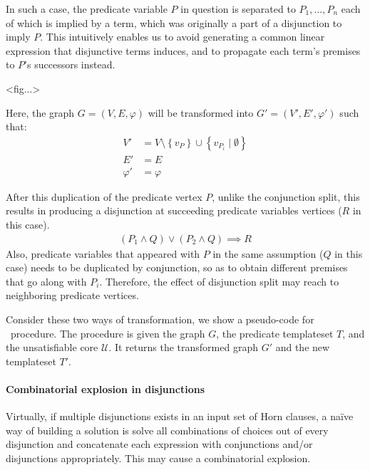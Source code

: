 \documentclass[master,final,12pt]{iscs-thesis}
\begin{document}
In such a case, the predicate variable $P$ in question is separated to
$P_1, \ldots, P_n$ each of which is implied by a term, which was
originally a part of a disjunction to imply $P$.  This intuitively
enables us to avoid generating a common linear expression that
disjunctive terms induces, and to propagate each term's premises to
$P$'s successors instead.

<fig...>

Here, the graph $G=(V,E,\varphi)$ will be transformed into
$G'=(V',E',\varphi')$ such that:
\begin{align*}
V' & = V \setminus \left\lbrace v_P \right\rbrace \cup
  \left\lbrace v_{P_i} \mid \emptyset \right\rbrace \\
E' & = E \\
\varphi' & = \varphi
\end{align*}

After this duplication of the predicate vertex $P$, unlike the
conjunction split, this results in producing a disjunction at
succeeding predicate variables vertices ($R$ in this case).
\begin{align*}
(P_1 \wedge Q) \vee (P_2 \wedge Q) \implies R
\end{align*}
Also, predicate variables that appeared with $P$ in the same
assumption ($Q$ in this case) needs to be duplicated by conjunction,
so as to obtain different premises that go along with $P_i$.
Therefore, the effect of disjunction split may reach to neighboring
predicate vertices.


Consider these two ways of transformation, we show a pseudo-code for
\transGraph~procedure.  The procedure is given the graph $G$, the
predicate templateset $T$, and the unsatisfiable core
$\mathcal{U}$. It returns the transformed graph $G'$ and the new
templateset $T'$.

\begin{algorithm}
\caption{$ \transGraph (G, T, \mathcal{U}) $}\label{alg:transGraph}
\begin{algorithmic}
\end{algorithmic}
\end{algorithm}


\paragraph{Combinatorial explosion in disjunctions}
Virtually, if multiple disjunctions exists in an input set of Horn
clauses, a na\"{i}ve way of building a solution is solve all
combinations of choices out of every disjunction and concatenate each
expression with conjunctions and/or disjunctions appropriately.  This
may cause a combinatorial explosion.
\end{document}
